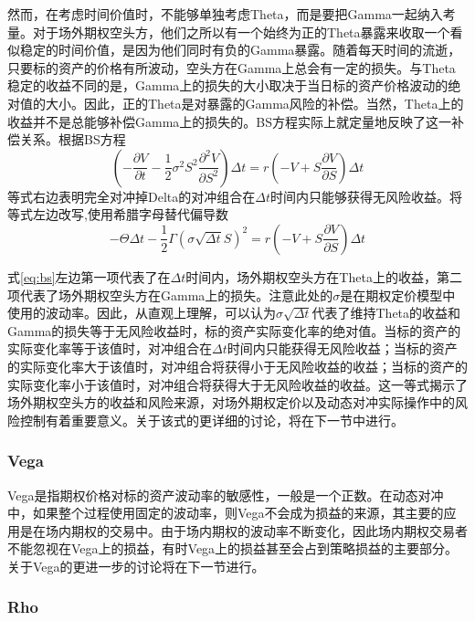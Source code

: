 然而，在考虑时间价值时，不能够单独考虑Theta，而是要把Gamma一起纳入考量。对于场外期权空头方，他们之所以有一个始终为正的Theta暴露来收取一个看似稳定的时间价值，是因为他们同时有负的Gamma暴露。随着每天时间的流逝，只要标的资产的价格有所波动，空头方在Gamma上总会有一定的损失。与Theta稳定的收益不同的是，Gamma上的损失的大小取决于当日标的资产价格波动的绝对值的大小。因此，正的Theta是对暴露的Gamma风险的补偿。当然，Theta上的收益并不是总能够补偿Gamma上的损失的。BS方程实际上就定量地反映了这一补偿关系。根据BS方程
\begin{equation}
  (-\frac{\partial V}{\partial t} - \frac{1}{2}\sigma^2S^2\frac{\partial^2 V}{\partial S^2})\Delta t=r(-V+S\frac{\partial V}{\partial S})\Delta t
\end{equation}
等式右边表明完全对冲掉Delta的对冲组合在$\Delta t$时间内只能够获得无风险收益。将等式左边改写,使用希腊字母替代偏导数
\begin{equation}
  -\Theta \Delta t - \frac{1}{2}\Gamma(\sigma \sqrt{\Delta t} S)^2=r(-V+S\frac{\partial V}{\partial S})\Delta t
  \label{eq:bs}
\end{equation}

式\ref{eq:bs}左边第一项代表了在$\Delta t$时间内，场外期权空头方在Theta上的收益，第二项代表了场外期权空头方在Gamma上的损失。注意此处的$\sigma$是在期权定价模型中使用的波动率。因此，从直观上理解，可以认为$\sigma \sqrt{\Delta t}$代表了维持Theta的收益和Gamma的损失等于无风险收益时，标的资产实际变化率的绝对值。当标的资产的实际变化率等于该值时，对冲组合在$\Delta t$时间内只能获得无风险收益；当标的资产的实际变化率大于该值时，对冲组合将获得小于无风险收益的收益；当标的资产的实际变化率小于该值时，对冲组合将获得大于无风险收益的收益。这一等式揭示了场外期权空头方的收益和风险来源，对场外期权定价以及动态对冲实际操作中的风险控制有着重要意义。关于该式的更详细的讨论，将在下一节中进行。

\subsubsection{Vega}

Vega是指期权价格对标的资产波动率的敏感性，一般是一个正数。在动态对冲中，如果整个过程使用固定的波动率，则Vega不会成为损益的来源，其主要的应用是在场内期权的交易中。由于场内期权的波动率不断变化，因此场内期权交易者不能忽视在Vega上的损益，有时Vega上的损益甚至会占到策略损益的主要部分。关于Vega的更进一步的讨论将在下一节进行。

\subsubsection{Rho}

